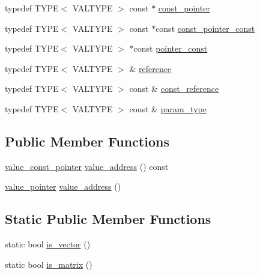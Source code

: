 \begin{DoxyCompactItemize}
\item 
typedef T\+Y\+PE$<$ V\+A\+L\+T\+Y\+PE $>$ const  $\ast$ \hyperlink{structglm_1_1detail_1_1gen_type_ade82fbfd7b15096223e1b133c148b5e2}{const\+\_\+pointer}
\item 
typedef T\+Y\+PE$<$ V\+A\+L\+T\+Y\+PE $>$ const  $\ast$const \hyperlink{structglm_1_1detail_1_1gen_type_a4f3f1bc18abdbdba5757fc63052157fa}{const\+\_\+pointer\+\_\+const}
\item 
typedef T\+Y\+PE$<$ V\+A\+L\+T\+Y\+PE $>$ $\ast$const \hyperlink{structglm_1_1detail_1_1gen_type_a4d7745054035d7efed18ec1d7215bbf0}{pointer\+\_\+const}
\item 
typedef T\+Y\+PE$<$ V\+A\+L\+T\+Y\+PE $>$ \& \hyperlink{structglm_1_1detail_1_1gen_type_a14792cf03ce9cfb37becd2da5d9ae06a}{reference}
\item 
typedef T\+Y\+PE$<$ V\+A\+L\+T\+Y\+PE $>$ const  \& \hyperlink{structglm_1_1detail_1_1gen_type_a509ca374a85f8a9ea319bc5a980d5f1a}{const\+\_\+reference}
\item 
typedef T\+Y\+PE$<$ V\+A\+L\+T\+Y\+PE $>$ const  \& \hyperlink{structglm_1_1detail_1_1gen_type_a92c8b989f574a63d4e0f5bfc8a4f3a32}{param\+\_\+type}
\end{DoxyCompactItemize}
\subsection*{Public Member Functions}
\begin{DoxyCompactItemize}
\item 
\hyperlink{structglm_1_1detail_1_1gen_type_a34e169ae6d50e1c76574c850eae2c7fc}{value\+\_\+const\+\_\+pointer} \hyperlink{structglm_1_1detail_1_1gen_type_a5dcc128cfa6f3fdc478d7169ec3cb71b}{value\+\_\+address} () const
\item 
\hyperlink{structglm_1_1detail_1_1gen_type_a3b272e7be29ab920f2877c00646f6f9b}{value\+\_\+pointer} \hyperlink{structglm_1_1detail_1_1gen_type_a146973ec142766743080c1895a9e3c65}{value\+\_\+address} ()
\end{DoxyCompactItemize}
\subsection*{Static Public Member Functions}
\begin{DoxyCompactItemize}
\item 
static bool \hyperlink{structglm_1_1detail_1_1gen_type_ae83087df55201bdc46a37decf3d1c34c}{is\+\_\+vector} ()
\item 
static bool \hyperlink{structglm_1_1detail_1_1gen_type_a78c650375558d5e2ccfba383cdb59479}{is\+\_\+matrix} ()
\end{DoxyCompactItemize}


